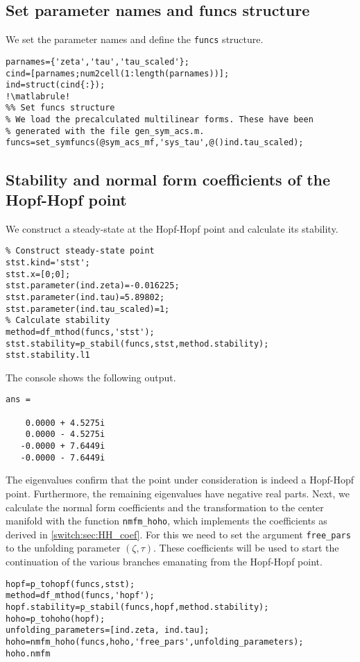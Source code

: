 \subsection{Set parameter names and funcs structure} \label{switch:sm:sec:acs:pars_and_funcs}
We set the parameter names and define the \lstinline|funcs| structure.
\begin{lstlisting}[style=customMatlab,escapechar=!]
%% Set parameter names
parnames={'zeta','tau','tau_scaled'};
cind=[parnames;num2cell(1:length(parnames))];
ind=struct(cind{:});
!\matlabrule!
%% Set funcs structure
% We load the precalculated multilinear forms. These have been
% generated with the file gen_sym_acs.m.
funcs=set_symfuncs(@sym_acs_mf,'sys_tau',@()ind.tau_scaled);
\end{lstlisting}

\subsection{Stability and normal form coefficients of the Hopf-Hopf point} We construct a steady-state at the Hopf-Hopf point and calculate its stability.
\begin{lstlisting}[style=customMatlab]
%% Hopf-Hopf point
% Construct steady-state point
stst.kind='stst';
stst.x=[0;0];
stst.parameter(ind.zeta)=-0.016225;
stst.parameter(ind.tau)=5.89802;
stst.parameter(ind.tau_scaled)=1;
% Calculate stability
method=df_mthod(funcs,'stst');
stst.stability=p_stabil(funcs,stst,method.stability);
stst.stability.l1
\end{lstlisting}
The \MATLAB console shows the following output.
\begin{lstlisting}[style=matlabConsole]
ans =

    0.0000 + 4.5275i
    0.0000 - 4.5275i
   -0.0000 + 7.6449i
   -0.0000 - 7.6449i
\end{lstlisting}
The eigenvalues confirm that the point under consideration is indeed a Hopf-Hopf point. Furthermore, the remaining eigenvalues have negative real parts. Next, we calculate the normal form coefficients and the transformation to the center manifold with the function \lstinline|nmfm_hoho|, which implements the coefficients as derived in \cref{switch:sec:HH_coef}. For this we need to set the argument \lstinline|free_pars| to the unfolding parameter $(\zeta,\tau)$. These coefficients will be used to start the continuation of the various branches emanating from the Hopf-Hopf point.
\begin{lstlisting}[style=customMatlab]
%% Calculate coefficients of the parameter dependent normal form
hopf=p_tohopf(funcs,stst);
method=df_mthod(funcs,'hopf');
hopf.stability=p_stabil(funcs,hopf,method.stability);
hoho=p_tohoho(hopf);
unfolding_parameters=[ind.zeta, ind.tau];
hoho=nmfm_hoho(funcs,hoho,'free_pars',unfolding_parameters);
hoho.nmfm
\end{lstlisting}

